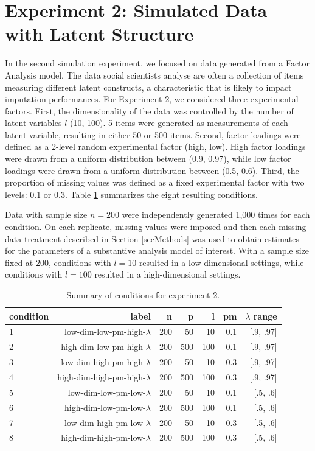 \section{Experiment 2: Simulated Data with Latent Structure}

In the second simulation experiment, we focused on data generated from a Factor Analysis model.
The data social scientists analyse are often a collection of items measuring different latent constructs, 
a characteristic that is likely to impact imputation performances.
For Experiment 2, we considered three experimental factors.
First, the dimensionality of the data was controlled by the number of latent variables $l$ (10, 100).
5 items were generated as measurements of each latent variable, resulting in either 50 or 500 items.
Second, factor loadings were defined as a 2-level random experimental factor (high, low).
High factor loadings were drawn from a uniform distribution between (0.9, 0.97), while low factor loadings
were drawn from a uniform distribution between (0.5, 0.6).
Third, the proportion of missing values was defined as a fixed experimental factor with two levels: 0.1 or 0.3.
Table \ref{tab:condExp2} summarizes the eight resulting conditions.

Data with sample size $n=200$ were independently generated 1,000 times for each condition.
On each replicate, missing values were imposed and then each missing data treatment described in Section \ref{secMethods}
was used to obtain estimates for the parameters of a substantive analysis model of interest.
With a sample size fixed at 200, conditions with $l = 10$ resulted in a low-dimensional settings, while conditions 
with $l = 100$ resulted in a high-dimensional settings.

\begin{table}
	\centering
	\begin{tabular}{l | r | r | r | r | r | r }
		condition & label & n & p & l & pm & $\lambda$ range \\
		\hline
		1 & low-dim-low-pm-high-$\lambda$ & 200 & 50 &  10 &  0.1 & [.9, .97] \\
		2 & high-dim-low-pm-high-$\lambda$ & 200 & 500 & 100 & 0.1 & [.9, .97] \\
		3 & low-dim-high-pm-high-$\lambda$ & 200 & 50 &  10 &  0.3 & [.9, .97] \\
		4 & high-dim-high-pm-high-$\lambda$ & 200 & 500 & 100 & 0.3 & [.9, .97] \\
		5 & low-dim-low-pm-low-$\lambda$ & 200 & 50 &  10 &  0.1 & [.5, .6]  \\
		6 & high-dim-low-pm-low-$\lambda$ & 200 & 500 & 100 & 0.1 & [.5, .6]  \\
		7 & low-dim-high-pm-low-$\lambda$ & 200 & 50 &  10 &  0.3 & [.5, .6]  \\
		8 & high-dim-high-pm-low-$\lambda$ & 200 & 500 & 100 & 0.3 & [.5, .6]  \\
	\end{tabular}
	\caption{\label{tab:condExp2}Summary of conditions for experiment 2.}
\end{table}

